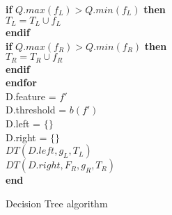 \begin{figure}
{\begin{minipage}{35cm}
\begin{tabbing}
      {\bf if } \(Q.max(f_L) > Q.min(f_L)\) {\bf then} \+ \\
        \(T_L = T_L \cup f_L \) \- \\
      {\bf endif} \\
      {\bf if } \(Q.max(f_R) > Q.min(f_R)\) {\bf then} \+ \\
        \(T_R = T_R \cup f_R \) \- \\
      {\bf endif} \- \\
    {\bf endfor} \\
    D.feature = \(f'\) \\
    D.threshold = \(b(f')\) \\
    D.left = \(\{\}\) \\
    D.right = \(\{\}\) \\
    \(DT(D.left, g_L, T_L)\) \\
    \(DT(D.right, F_R, g_R, T_R)\) \- \\
{\bf end} 
\end{tabbing}
\end{minipage}
}
\label{dt_pseudo_code}
\caption{Decision Tree algorithm}
\end{figure}

